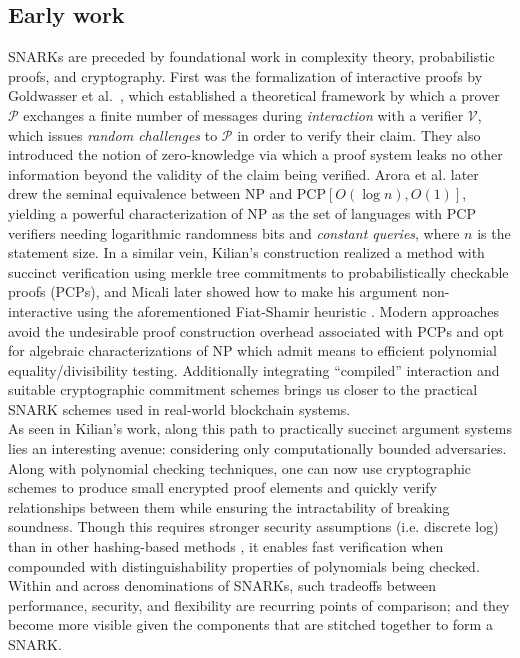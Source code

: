 \subsection{Early work}
\noindent SNARKs are preceded by foundational work in complexity theory, probabilistic proofs, and cryptography. First was the formalization of interactive proofs by Goldwasser et al.\ \cite{ipfirst}, which established a theoretical framework by which a prover $\mathcal{P}$ exchanges a finite number of messages during \textit{interaction} with a verifier $\mathcal{V}$, which issues \textit{random challenges} to $\mathcal{P}$ in order to verify their claim. They also introduced the notion of zero-knowledge via which a proof system leaks no other information beyond the validity of the claim being verified. Arora et al. \cite{pcpthm1, pcpthm2} later drew the seminal equivalence between NP and PCP$[O(\log n), O(1)]$, yielding a powerful characterization of NP as the set of languages with PCP verifiers needing logarithmic randomness bits and \textit{constant queries}, where $n$ is the statement size. In a similar vein, Kilian's construction \cite{kilian} realized a method with succinct verification using merkle tree commitments to probabilistically checkable proofs (PCPs), and Micali later showed how to make his argument non-interactive \cite{micalisnark} using the aforementioned Fiat-Shamir heuristic \cite{fiatshamir}. Modern approaches avoid the undesirable proof construction overhead associated with PCPs and opt for algebraic characterizations of NP which admit means to efficient polynomial equality/divisibility testing. Additionally integrating ``compiled'' interaction and suitable cryptographic commitment schemes brings us closer to the practical SNARK schemes used in real-world blockchain systems.\\

\noindent As seen in Kilian's work, along this path to practically succinct argument systems lies an interesting avenue: considering only computationally bounded adversaries. Along with polynomial checking techniques, one can now use cryptographic schemes to produce small encrypted proof elements and quickly verify relationships between them while ensuring the intractability of breaking soundness. Though this requires stronger security assumptions (i.e. discrete log) than in other hashing-based methods \cite{starks, ligero, hyrax, aurora}, it enables fast verification when compounded with distinguishability properties of polynomials being checked. Within and across denominations of SNARKs, such tradeoffs between performance, security, and flexibility are recurring points of comparison; and they become more visible given the components that are stitched together to form a SNARK.


